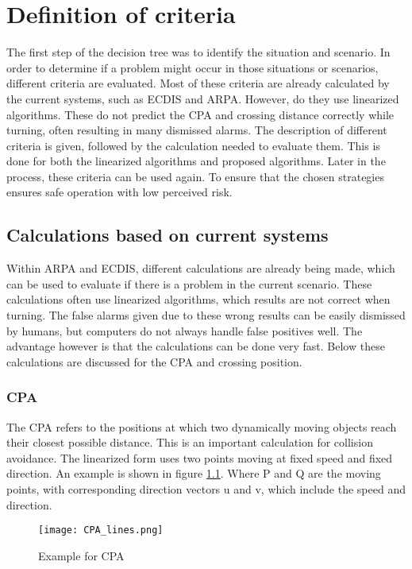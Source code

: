 \chapter{Definition of criteria}
\label{ch:criteria-problem}
The first step of the decision tree was to identify the situation and scenario. In order to determine if a problem might occur in those situations or scenarios, different criteria are evaluated. Most of these criteria are already calculated by the current systems, such as \ac{ECDIS} and \ac{ARPA}. However, do they use linearized algorithms. These do not predict the \ac{CPA} and crossing distance correctly while turning, often resulting in many dismissed alarms. The description of different criteria is given, followed by the calculation needed to evaluate them. This is done for both the linearized algorithms and proposed algorithms. Later in the process, these criteria can be used again. To ensure that the chosen strategies ensures safe operation with low perceived risk.

\section{Calculations based on current systems}
Within \ac{ARPA} and \ac{ECDIS}, different calculations are already being made, which can be used to evaluate if there is a problem in the current scenario. These calculations often use linearized algorithms, which results are not correct when turning. The false alarms given due to these wrong results can be easily dismissed by humans, but computers do not always handle false positives well. The advantage however is that the calculations can be done very fast. Below these calculations are discussed for the \acf{CPA} and crossing position.

\subsection{\acf{CPA}}
The \ac{CPA} refers to the positions at which two dynamically moving objects reach their closest possible distance. This is an important calculation for collision avoidance. The linearized form uses two points moving at fixed speed and fixed direction. An example is shown in figure \ref{fig:CPA}. Where P and Q are the moving points, with corresponding direction vectors u and v, which include the speed and direction.

\begin{figure}[h]
	\centering
	\texttt{[image: CPA\_lines.png]}
	\caption{Example for \acf{CPA}}
	\label{fig:CPA}
\end{figure}

